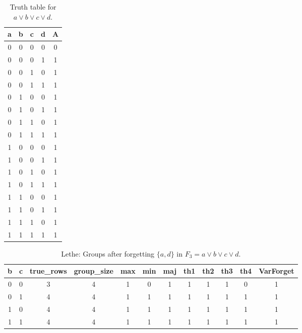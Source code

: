 \begin{table}[!tb]
    \centering
    \begin{tabular}{|c|c|c|c|c|}
        \hline
        \textbf{a} & \textbf{b} & \textbf{c} & \textbf{d} & \textbf{A} \\ \hline
        0 & 0 & 0 & 0 & 0 \\ \hline
        0 & 0 & 0 & 1 & 1 \\ \hline
        0 & 0 & 1 & 0 & 1 \\ \hline
        0 & 0 & 1 & 1 & 1 \\ \hline
        0 & 1 & 0 & 0 & 1 \\ \hline
        0 & 1 & 0 & 1 & 1 \\ \hline
        0 & 1 & 1 & 0 & 1 \\ \hline
        0 & 1 & 1 & 1 & 1 \\ \hline
        1 & 0 & 0 & 0 & 1 \\ \hline
        1 & 0 & 0 & 1 & 1 \\ \hline
        1 & 0 & 1 & 0 & 1 \\ \hline
        1 & 0 & 1 & 1 & 1 \\ \hline
        1 & 1 & 0 & 0 & 1 \\ \hline
        1 & 1 & 0 & 1 & 1 \\ \hline
        1 & 1 & 1 & 0 & 1 \\ \hline
        1 & 1 & 1 & 1 & 1 \\ \hline
    \end{tabular}
    \caption{Truth table for $a \lor b \lor c \lor d$.}
    \label{tab:truthtab}
\end{table}

\begin{table}[!tb]
    \centering
    \begin{tabular}{|c|c|c|c|c|c|c|c|c|c|c|c|}
        \hline
        \textbf{b} & \textbf{c} & \textbf{true\_rows} & \textbf{group\_size} & \textbf{max} & \textbf{min} & \textbf{maj} & \textbf{th1} & \textbf{th2} & \textbf{th3} & \textbf{th4} & \textbf{VarForget} \\ \hline
        \rowcolor{gray!40} 0 & 0 & 3 & 4 & 1 & 0 & 1 & 1 & 1 & 1 & 0 & 1 \\ \hline
        \rowcolor{blue!40} 0 & 1 & 4 & 4 & 1 & 1 & 1 & 1 & 1 & 1 & 1 & 1 \\ \hline
        \rowcolor{red!40} 1 & 0 & 4 & 4 & 1 & 1 & 1 & 1 & 1 & 1 & 1 & 1 \\ \hline
        \rowcolor{green!40} 1 & 1 & 4 & 4 & 1 & 1 & 1 & 1 & 1 & 1 & 1 & 1 \\ \hline
    \end{tabular}
    \caption{Lethe: Groups after forgetting $\{a, d\}$ in $F_{3} = a \lor b \lor c \lor d$.}
    \label{tab:lethe-F3-ad-groups}
\end{table}
